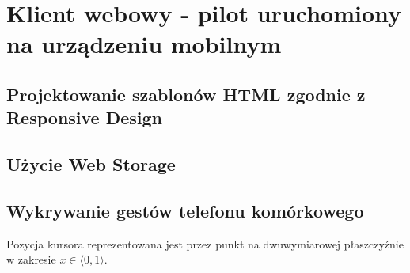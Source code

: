 \section{Klient webowy - pilot uruchomiony na urządzeniu mobilnym}

\subsection{Projektowanie szablonów HTML zgodnie z Responsive Design}

\subsection{Użycie Web Storage}

\subsection{Wykrywanie gestów telefonu komórkowego}

Pozycja kursora reprezentowana jest przez punkt na dwuwymiarowej płaszczyźnie w zakresie \( x\in \langle0, 1\rangle \).

